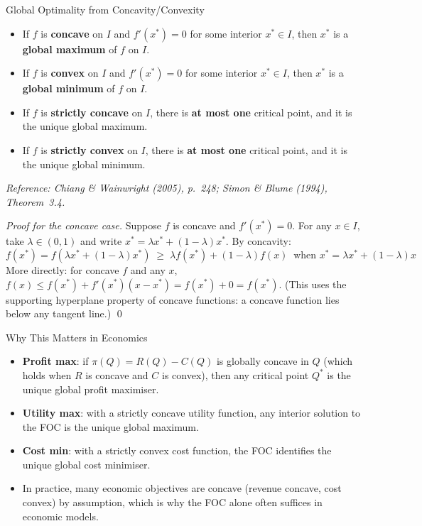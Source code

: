 \documentclass[12pt, a4paper]{article}
\theoremstyle{definition}
\begin{document}
\begin{thmbox}{Global Optimality from Concavity/Convexity}
\begin{itemize}
  \item If $f$ is \textbf{concave} on $I$ and $f'(x^*)=0$ for some
        interior $x^* \in I$, then $x^*$ is a \textbf{global maximum} of
        $f$ on $I$.
  \item If $f$ is \textbf{convex} on $I$ and $f'(x^*)=0$ for some
        interior $x^* \in I$, then $x^*$ is a \textbf{global minimum} of
        $f$ on $I$.
  \item If $f$ is \textbf{strictly concave} on $I$, there is \textbf{at
        most one} critical point, and it is the unique global maximum.
  \item If $f$ is \textbf{strictly convex} on $I$, there is \textbf{at
        most one} critical point, and it is the unique global minimum.
\end{itemize}
\emph{Reference: Chiang \& Wainwright (2005), p.\ 248;
Simon \& Blume (1994), Theorem~3.4.}
\end{thmbox}

\begin{proof}[Proof for the concave case]
Suppose $f$ is concave and $f'(x^*)=0$.  For any $x \in I$, take
$\lambda \in (0,1)$ and write $x^* = \lambda x^* + (1-\lambda)x^*$.
By concavity:
\[
  f(x^*) = f(\lambda x^* + (1-\lambda)x^*)
  \; \geq \; \lambda f(x^*) + (1-\lambda)f(x)
  \;\; \text{when } x^* = \lambda x^* + (1-\lambda)x
\]
More directly: for concave $f$ and any $x$,
$f(x) \leq f(x^*) + f'(x^*)(x-x^*) = f(x^*) + 0 = f(x^*)$.
(This uses the supporting hyperplane property of concave functions:
a concave function lies below any tangent line.) \qed
\end{proof}

\begin{keybox}{Why This Matters in Economics}
\begin{itemize}
  \item \textbf{Profit max}: if $\pi(Q) = R(Q)-C(Q)$ is globally concave
        in $Q$ (which holds when $R$ is concave and $C$ is convex), then
        any critical point $Q^*$ is the unique global profit maximiser.
  \item \textbf{Utility max}: with a strictly concave utility function,
        any interior solution to the FOC is the unique global maximum.
  \item \textbf{Cost min}: with a strictly convex cost function, the FOC
        identifies the unique global cost minimiser.
  \item In practice, many economic objectives are concave (revenue concave,
        cost convex) by assumption, which is why the FOC alone often
        suffices in economic models.
\end{itemize}
\end{keybox}
\end{document}
